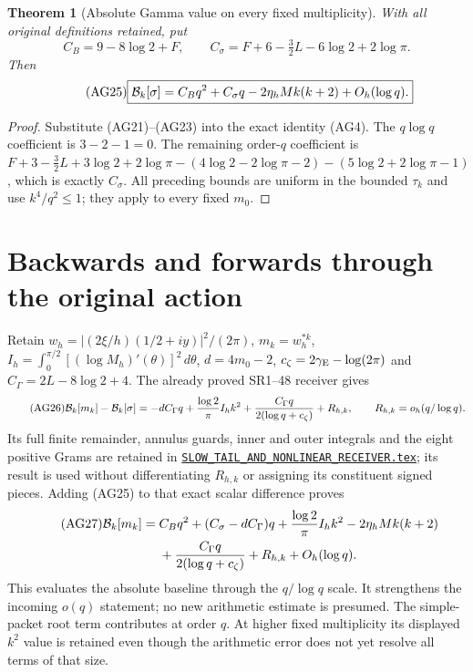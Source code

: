 \documentclass[11pt]{article}
\newtheorem{theorem}{Theorem}\newtheorem{lemma}[theorem]{Lemma}
\newcommand{\dd}{\,d}\newcommand{\Gram}{\operatorname{Gram}}
\begin{document}
\begin{theorem}[Absolute Gamma value on every fixed multiplicity]
With all original definitions retained, put
\begin{equation}\tag{AG24}
 C_B=9-8\log2+F,\qquad
 C_\sigma=F+6-\tfrac32L-6\log2+2\log\pi.
\end{equation}
Then
\begin{equation}\tag{AG25}
 \boxed{\mathcal B_k[\sigma]=C_Bq^2+C_\sigma q
       -2\eta_hM k(k+2)+O_h(\log q).}
\end{equation}
\end{theorem}
\begin{proof}
Substitute (AG21)--(AG23) into the exact identity (AG4).
The $q\log q$ coefficient is $3-2-1=0$.
The remaining order-$q$ coefficient is
$F+3-\tfrac32L+3\log2+2\log\pi
-(4\log2-2\log\pi-2)-(5\log2+2\log\pi-1)$,
which is exactly $C_\sigma$. All preceding bounds are uniform in the
bounded $\tau_k$ and use $k^4/q^2\le1$; they apply to every fixed $m_0$.
\end{proof}

\section{Backwards and forwards through the original action}
Retain $w_h=|(2\xi/h)(1/2+iy)|^2/(2\pi)$, $m_k=w_h^{*k}$,
$I_h=\int_0^{\pi/2}[(\log M_h)'(\theta)]^2\dd\theta$,
$d=4m_0-2$, $c_\zeta=2\gamma_{\rm E}-\log(2\pi)$ and
$C_\Gamma=2L-8\log2+4$. The already proved SR1--48 receiver gives
\begin{equation}\tag{AG26}
 \mathcal B_k[m_k]-\mathcal B_k[\sigma]
 =-dC_\Gamma q+\frac{\log2}{\pi}I_hk^2
  +\frac{C_\Gamma q}{2(\log q+c_\zeta)}+R_{h,k},
 \qquad R_{h,k}=o_h(q/\log q).
\end{equation}
Its full finite remainder, annulus guards, inner and outer integrals and
the eight positive Grams are retained in
\href{https://github.com/KokunoYumeto/zeta-function-research-reader/blob/487253b5b01851da5b9b98af4e146fecf1fab902/workbenches/splitzero-tandem/continuations/20260919-arithmetic-signs-marked-classes/arrival_02/signed_refinement/SLOW_TAIL_AND_NONLINEAR_RECEIVER.tex\#L1}{\texttt{SLOW\_TAIL\_AND\_NONLINEAR\_RECEIVER.tex}}; its result is used
without differentiating $R_{h,k}$ or assigning its constituent signed pieces.
Adding (AG25) to that exact scalar difference proves
\begin{align}\tag{AG27}
 \mathcal B_k[m_k]={}&C_Bq^2+(C_\sigma-dC_\Gamma)q
 +\frac{\log2}{\pi}I_hk^2-2\eta_hMk(k+2)\\
 &+\frac{C_\Gamma q}{2(\log q+c_\zeta)}
 +R_{h,k}+O_h(\log q).\notag
\end{align}
This evaluates the absolute baseline through the $q/\log q$ scale.
It strengthens the incoming $o(q)$ statement; no new arithmetic estimate
is presumed. The simple-packet root term contributes at order $q$.
At higher fixed multiplicity its displayed $k^2$ value is retained even
though the arithmetic error does not yet resolve all terms of that size.
\end{document}
